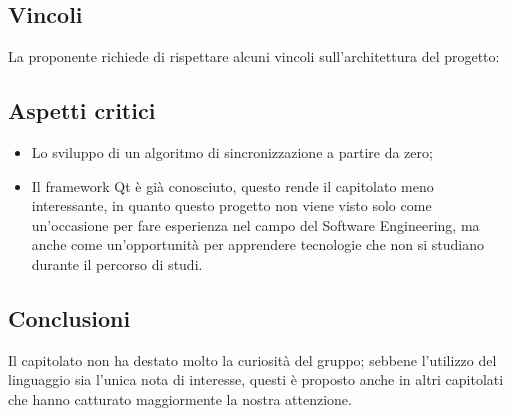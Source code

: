 \subsection{Vincoli}
La proponente richiede di rispettare alcuni vincoli sull'architettura del progetto: 

\subsection{Aspetti critici}
\begin{itemize}
\item Lo sviluppo di un algoritmo di sincronizzazione a partire da zero;
\item Il framework Qt è già conosciuto, questo rende il capitolato meno interessante, in quanto questo progetto non viene visto solo come un'occasione per fare esperienza nel campo del Software Engineering, ma anche come un'opportunità per apprendere tecnologie che non si studiano durante il percorso di studi.
\end{itemize}

\subsection{Conclusioni}
Il capitolato non ha destato molto la curiosità del gruppo; sebbene l'utilizzo del linguaggio  sia l'unica nota di interesse, questi è proposto anche in altri capitolati che hanno catturato maggiormente la nostra attenzione.
